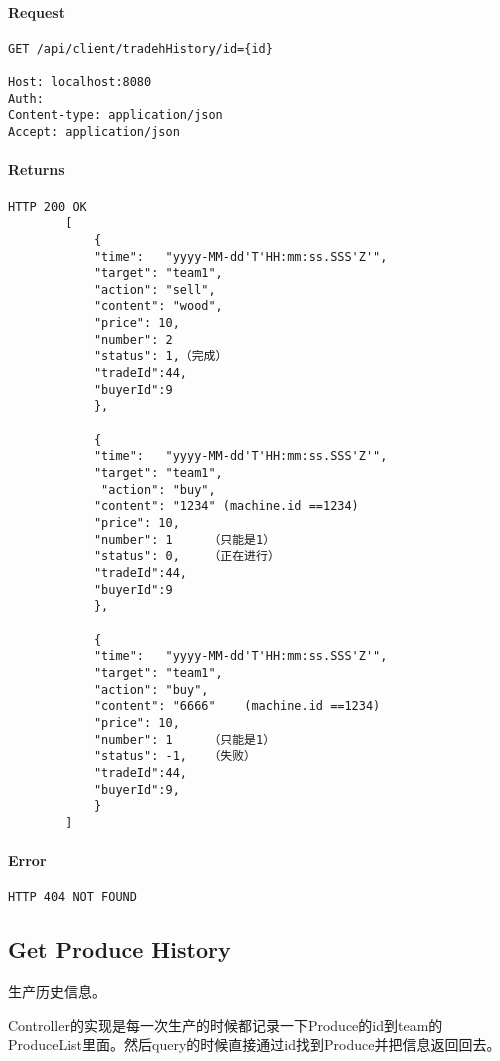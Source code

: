 \documentclass{article}
\begin{document}
					\paragraph*{Request}
\begin{lstlisting}
GET /api/client/tradehHistory/id={id}

Host: localhost:8080
Auth:
Content-type: application/json
Accept: application/json
\end{lstlisting}
					\paragraph*{Returns}
\begin{lstlisting}
HTTP 200 OK
        [
            {
            "time":   "yyyy-MM-dd'T'HH:mm:ss.SSS'Z'",
            "target": "team1",
            "action": "sell",
            "content": "wood",
            "price": 10,
            "number": 2
            "status": 1,（完成）
            "tradeId":44,
            "buyerId":9
            },

            {
            "time":   "yyyy-MM-dd'T'HH:mm:ss.SSS'Z'",
            "target": "team1",
             "action": "buy",
            "content": "1234" (machine.id ==1234)
            "price": 10,
            "number": 1     （只能是1）
            "status": 0,    （正在进行）
            "tradeId":44,
            "buyerId":9
            },

            {
            "time":   "yyyy-MM-dd'T'HH:mm:ss.SSS'Z'",
            "target": "team1",
            "action": "buy",
            "content": "6666"    (machine.id ==1234)
            "price": 10,
            "number": 1     （只能是1）
            "status": -1,   （失败）
            "tradeId":44,
            "buyerId":9,
            }
        ]\end{lstlisting}
					\paragraph*{Error}
\begin{lstlisting}
HTTP 404 NOT FOUND
\end{lstlisting}

				\subsection{Get Produce History}
					生产历史信息。

                    Controller的实现是每一次生产的时候都记录一下Produce的id到team的ProduceList里面。然后query的时候直接通过id找到Produce并把信息返回回去。
\end{document}
